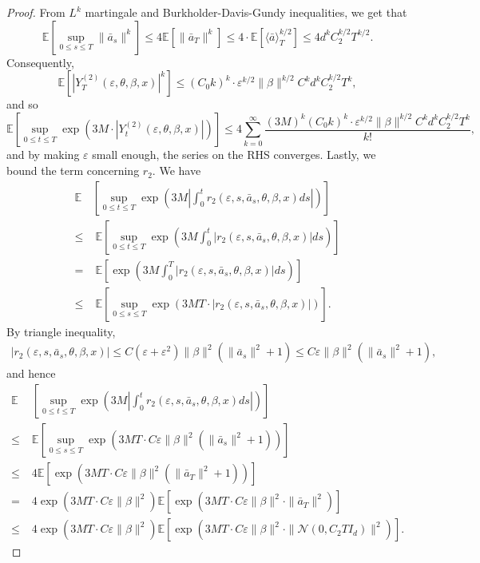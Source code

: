 \documentclass{article}
\newcommand{\eps}{\epsilon}
\newcommand{\1}{\mathbbm{1}}
\newcommand{\E}{\mathbb E}
\renewcommand{\H}{\mathcal{H}}
\numberwithin{equation}{section}
\def\eps{\varepsilon}
\def\E{{\bf E}} \def\H{{\bf H}} \def\J{{\bf J}}
\def\E{\mathbb{E}}
\begin{document}
\begin{proof}
From $L^{k}$ martingale and Burkholder-Davis-Gundy inequalities, we get that
$$\E\left[\sup_{0\leq s\leq T}\|\bar a_{s}\|^{k}\right]\leq 4\E\left[\|\bar a_{T}\|^{k}\right]\leq 4\cdot \E\left[\langle \bar a\rangle_{T}^{k/2}\right]\leq 4d^{k}C_{2}^{k/2}T^{k/2}.$$
Consequently,
$$\E\left[|Y_{T}^{(2)}(\eps,\theta, \beta, x)|^{k}\right]\leq (C_{0}k)^{k}\cdot \eps^{k/2}\|\beta\|^{k/2}C^{k}d^{k}C_{2}^{k/2}T^{k},$$
and so
$$\E\left[\sup_{0\leq t\leq T}\exp\left(3M\cdot |Y_{t}^{(2)}(\eps, \theta, \beta, x)|\right)\right]\leq4\sum_{k=0}^{\infty}\dfrac{(3M)^{k}(C_{0}k)^{k}\cdot \eps^{k/2}\|\beta\|^{k/2}C^{k}d^{k}C_{2}^{k/2}T^{k}}{k!},$$
and by making $\eps$ small enough, the series on the RHS converges. Lastly, we bound the term concerning $r_{2}$. We have
\begin{align*}
\E&\left[\sup_{0\leq t\leq T}\exp\left(3M\left|\int_{0}^{t}r_{2}(\eps, s, \bar a_{s}, \theta, \beta, x)ds\right|\right)\right]
\\
\leq&\;\E\left[\sup_{0\leq t\leq T}\exp\left(3M\int_{0}^{t}|r_{2}(\eps, s, \bar a_{s}, \theta, \beta, x)|ds\right)\right]\\
=&\;\E\left[\exp\left(3M\int_{0}^{T}|r_{2}(\eps, s, \bar a_{s}, \theta,\beta, x)|ds\right)\right]\\
\leq&\;\E\left[\sup_{0\leq s\leq T}\exp\left(3MT\cdot |r_{2}(\eps, s, \bar a_{s}, \theta, \beta, x)|\right)\right].
\end{align*}
By triangle inequality,
\begin{align*}
|r_{2}(\eps, s, \bar a_{s}, \theta, \beta, x)|\leq C(\eps+\eps^{2})\|\beta\|^{2}(\|\bar a_{s}\|^{2}+1)\leq C\eps\|\beta\|^{2}(\|\bar a_{s}\|^{2}+1),
\end{align*}
and hence
\begin{align*}
\E&\left[\sup_{0\leq t\leq T}\exp\left(3M\left|\int_{0}^{t}r_{2}(\eps, s, \bar a_{s}, \theta, \beta, x)ds\right|\right)\right]
\\
\leq\;&\E\left[\sup_{0\leq s\leq T}\exp\left(3MT\cdot C\eps\|\beta\|^{2}(\|\bar a_{s}\|^{2}+1)\right)\right]\\
\leq\;&4\E\left[\exp\left(3MT\cdot C\eps\|\beta\|^{2}(\|\bar a_{T}\|^{2}+1)\right)\right]\\
=\;&4\exp(3MT\cdot C\eps\|\beta\|^{2})\E\left[\exp\left(3MT\cdot C\eps\|\beta\|^{2}\cdot \|\bar a_{T}\|^{2}\right)\right]\\
\leq\;&4\exp(3MT\cdot C\eps\|\beta\|^{2})\E\left[\exp\left(3MT\cdot C\eps\|\beta\|^{2}\cdot \|\mathcal{N}(0, C_{2}TI_{d})\|^{2}\right)\right].
\end{align*}

\end{proof}
\end{document}
